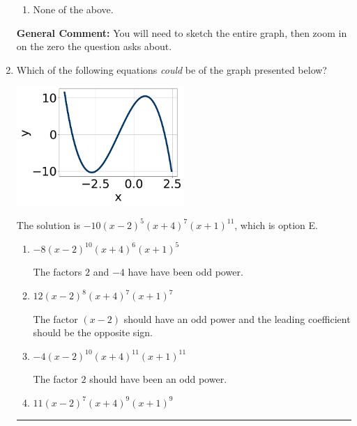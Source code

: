\documentclass{extbook}[14pt]
\newcommand{\litem}[1]{\item #1

\rule{\textwidth}{0.4pt}}
\begin{document}
\begin{enumerate}
{\begin{enumerate}[label=\Alph*.]
\item None of the above.\end{enumerate}
\textbf{General Comment:} You will need to sketch the entire graph, then zoom in on the zero the question asks about.
}
\litem{
Which of the following equations \textit{could} be of the graph presented below?

\begin{center}
    \includegraphics[width=0.5\textwidth]{../Figures/polyGraphToFunctionB.png}
\end{center}


The solution is \( -10(x - 2)^{5} (x + 4)^{7} (x + 1)^{11} \), which is option E.\begin{enumerate}[label=\Alph*.]
\item \( -8(x - 2)^{10} (x + 4)^{6} (x + 1)^{5} \)

The factors $2$ and $-4$ have have been odd power.
\item \( 12(x - 2)^{8} (x + 4)^{7} (x + 1)^{7} \)

The factor $(x - 2)$ should have an odd power and the leading coefficient should be the opposite sign.
\item \( -4(x - 2)^{10} (x + 4)^{11} (x + 1)^{11} \)

The factor $2$ should have been an odd power.
\item \( 11(x - 2)^{7} (x + 4)^{9} (x + 1)^{9} \)


\end{enumerate}}
\end{enumerate}
\end{document}
